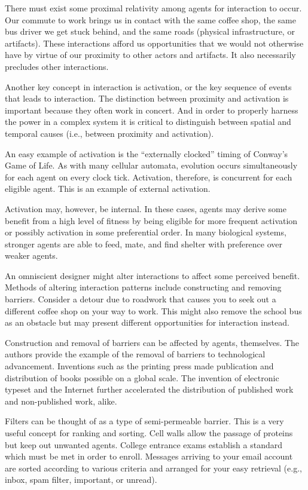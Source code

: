 \documentclass[jou,apacite]{apa6}
\begin{document}
There must exist some proximal relativity among agents for interaction to occur.  Our commute to work brings us in contact with the same coffee shop, the same bus driver we get stuck behind, and the same roads (physical infrastructure, or artifacts).  These interactions afford us opportunities that we would not otherwise have by virtue of our proximity to other actors and artifacts.  It also necessarily precludes other interactions.

Another key concept in interaction is activation, or the key sequence of events that leads to interaction.  The distinction between proximity and activation is important because they often work in concert.  And in order to properly harness the power in a complex system it is critical to distinguish between spatial and temporal causes (i.e., between proximity and activation).

An easy example of activation is the ``externally clocked'' timing of Conway's Game of Life.  As with many cellular automata, evolution occurs simultaneously for each agent on every clock tick.  Activation, therefore, is concurrent for each eligible agent.  This is an example of external activation.  

Activation may, however, be internal.  In these cases, agents may derive some benefit from a high level of fitness by being eligible for more frequent activation or possibly activation in some preferential order.  In many biological systems, stronger agents are able to feed, mate, and find shelter with preference over weaker agents.

An omniscient designer might alter interactions to affect some perceived benefit.  Methods of altering interaction patterns include constructing and removing barriers.  Consider a detour due to roadwork that causes you to seek out a different coffee shop on your way to work.  This might also remove the school bus as an obstacle but may present different opportunities for interaction instead.

Construction and removal of barriers can be affected by agents, themselves.  The authors provide the example of the removal of barriers to technological advancement.  Inventions such as the printing press made publication and distribution of books possible on a global scale.  The invention of electronic typeset and the Internet further accelerated the distribution of published work and non-published work, alike.

Filters can be thought of as a type of semi-permeable barrier.  This is a very useful concept for ranking and sorting.  Cell walls allow the passage of proteins but keep out unwanted agents.  College entrance exams establish a standard which must be met in order to enroll.  Messages arriving to your email account are sorted according to various criteria and arranged for your easy retrieval (e.g., inbox, spam filter, important, or unread).
\end{document}
